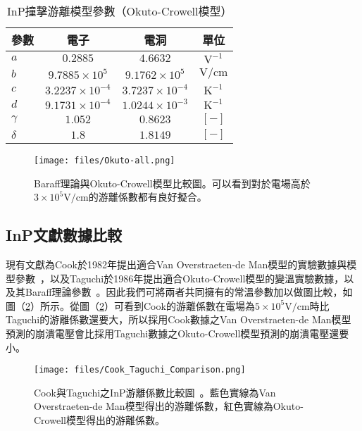 \begin{table}[h]
\begin{center}
\caption[InP之撞擊游離模型參數(2)]{InP撞擊游離模型參數（Okuto-Crowell模型）} \label{t:ii-InP-Okuto-Crowell-parameter}
\begin{tabular}{lccc}
\hline
 參數 &	電子		&	電洞		&	單位		\\
\hline
$a$	&	$0.2885$	&	$4.6632$	&	$\mathrm{V}^{-1}$	\\
$b$	&	$9.7885\times10^5$	&	$9.1762\times10^5$	&	$\mathrm{V}/\mathrm{cm}$	\\
$c$ &	$3.2237\times10^{-4}$	&	$3.7237\times10^{-4}$	&	$\mathrm{K}^{-1}$\\
$d$ &	$9.1731\times10^{-4}$	&	$1.0244\times10^{-3}$	&	$\mathrm{K}^{-1}$\\
$\gamma$ &	$1.052$	&	$0.8623$	&	$[-]$	\\
$\delta$ &	$1.8$	&	$1.8149$	&	$[-]$	\\
\hline
\end{tabular}
\end{center}
\end{table}
\begin{figure}[h]
\centering
\texttt{[image: files/Okuto-all.png]}
\caption[Baraff理論與Okuto-Crowell模型比較圖]{Baraff理論與Okuto-Crowell模型比較圖。可以看到對於電場高於$3\times10^5\left.\mathrm{V}/\mathrm{cm}\right.$的游離係數都有良好擬合。}
\label{fig:Okuto-all}
\end{figure}
\subsection{InP文獻數據比較}\label{css:InP-ionization-comparison}
現有文獻為Cook於1982年提出適合Van Overstraeten-de Man模型的實驗數據與模型參數~\cite{cook1982electron}，以及Taguchi於1986年提出適合Okuto-Crowell模型的變溫實驗數據，以及其Baraff理論參數~\cite{taguchi1986temperature}。因此我們可將兩者共同擁有的常溫參數加以做圖比較，如圖（\ref{fig:Cook_Taguchi_Comparison}）所示。從圖（\ref{fig:Cook_Taguchi_Comparison}）可看到Cook的游離係數在電場為$5\times10^5\left.\mathrm{V}/\mathrm{cm}\right.$時比Taguchi的游離係數還要大，所以採用Cook數據之Van Overstraeten-de Man模型預測的崩潰電壓會比採用Taguchi數據之Okuto-Crowell模型預測的崩潰電壓還要小。
\begin{figure}[h]
\centering
\texttt{[image: files/Cook\_Taguchi\_Comparison.png]}
\caption[Cook與Taguchi之InP游離係數比較圖]{Cook與Taguchi之InP游離係數比較圖~\cite{cook1982electron}\cite{taguchi1986temperature}。藍色實線為Van Overstraeten-de Man模型得出的游離係數，紅色實線為Okuto-Crowell模型得出的游離係數。}
\label{fig:Cook_Taguchi_Comparison}
\end{figure}
